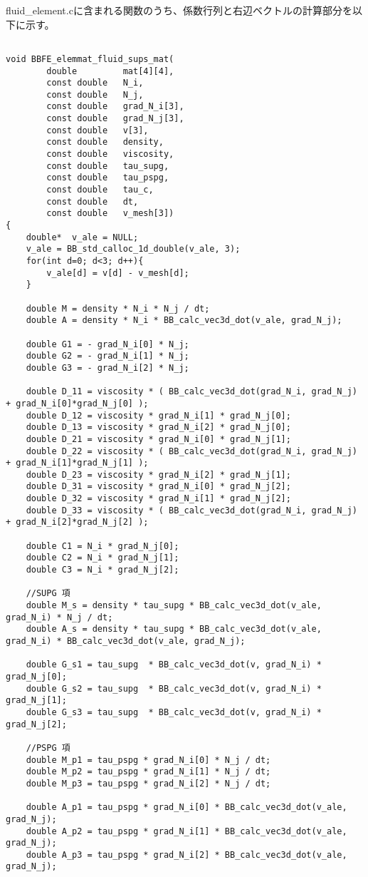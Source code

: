 fluid\_element.cに含まれる関数のうち、係数行列と右辺ベクトルの計算部分を以下に示す。
\begin{lstlisting}[caption = fluid\_element.cの係数行列の計算]

void BBFE_elemmat_fluid_sups_mat(
		double         mat[4][4],
		const double   N_i,
		const double   N_j,
		const double   grad_N_i[3],
		const double   grad_N_j[3],
		const double   v[3],
		const double   density,
		const double   viscosity,
		const double   tau_supg,
		const double   tau_pspg,
		const double   tau_c,
		const double   dt,
		const double   v_mesh[3])
{
	double*  v_ale = NULL;
	v_ale = BB_std_calloc_1d_double(v_ale, 3);
	for(int d=0; d<3; d++){
		v_ale[d] = v[d] - v_mesh[d];
	}

	double M = density * N_i * N_j / dt;
	double A = density * N_i * BB_calc_vec3d_dot(v_ale, grad_N_j);

	double G1 = - grad_N_i[0] * N_j;
	double G2 = - grad_N_i[1] * N_j;
	double G3 = - grad_N_i[2] * N_j;

	double D_11 = viscosity * ( BB_calc_vec3d_dot(grad_N_i, grad_N_j) + grad_N_i[0]*grad_N_j[0] );
	double D_12 = viscosity * grad_N_i[1] * grad_N_j[0];
	double D_13 = viscosity * grad_N_i[2] * grad_N_j[0];
	double D_21 = viscosity * grad_N_i[0] * grad_N_j[1];
	double D_22 = viscosity * ( BB_calc_vec3d_dot(grad_N_i, grad_N_j) + grad_N_i[1]*grad_N_j[1] );
	double D_23 = viscosity * grad_N_i[2] * grad_N_j[1];
	double D_31 = viscosity * grad_N_i[0] * grad_N_j[2];
	double D_32 = viscosity * grad_N_i[1] * grad_N_j[2];
	double D_33 = viscosity * ( BB_calc_vec3d_dot(grad_N_i, grad_N_j) + grad_N_i[2]*grad_N_j[2] );

	double C1 = N_i * grad_N_j[0];
	double C2 = N_i * grad_N_j[1];
	double C3 = N_i * grad_N_j[2];

	//SUPG 項
	double M_s = density * tau_supg * BB_calc_vec3d_dot(v_ale, grad_N_i) * N_j / dt;
	double A_s = density * tau_supg * BB_calc_vec3d_dot(v_ale, grad_N_i) * BB_calc_vec3d_dot(v_ale, grad_N_j);

	double G_s1 = tau_supg  * BB_calc_vec3d_dot(v, grad_N_i) * grad_N_j[0];
	double G_s2 = tau_supg  * BB_calc_vec3d_dot(v, grad_N_i) * grad_N_j[1];
	double G_s3 = tau_supg  * BB_calc_vec3d_dot(v, grad_N_i) * grad_N_j[2];

	//PSPG 項
	double M_p1 = tau_pspg * grad_N_i[0] * N_j / dt;
	double M_p2 = tau_pspg * grad_N_i[1] * N_j / dt;
	double M_p3 = tau_pspg * grad_N_i[2] * N_j / dt;

	double A_p1 = tau_pspg * grad_N_i[0] * BB_calc_vec3d_dot(v_ale, grad_N_j);
	double A_p2 = tau_pspg * grad_N_i[1] * BB_calc_vec3d_dot(v_ale, grad_N_j);
	double A_p3 = tau_pspg * grad_N_i[2] * BB_calc_vec3d_dot(v_ale, grad_N_j);


\end{lstlisting}

